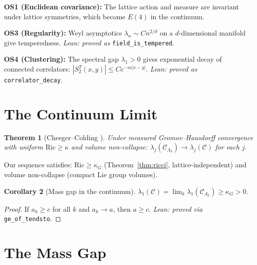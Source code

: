 \documentclass[11pt]{article}
\newtheorem{theorem}{Theorem}[section]
\newtheorem{corollary}[theorem]{Corollary}
\theoremstyle{definition}
\newcommand{\calC}{\mathcal{C}}
\newcommand{\Ric}{\mathrm{Ric}}
\begin{document}
\textbf{OS1 (Euclidean covariance):} The lattice action and measure are invariant under lattice symmetries, which become $E(4)$ in the continuum.

\textbf{OS3 (Regularity):} Weyl asymptotics $\lambda_n \sim Cn^{2/d}$ on a $d$-dimensional manifold give temperedness. \textit{Lean: proved as} \texttt{field\_is\_tempered}.

\textbf{OS4 (Clustering):} The spectral gap $\lambda_1 > 0$ gives exponential decay of connected correlators: $|S_2^T(x,y)| \leq Ce^{-m|x-y|}$. \textit{Lean: proved as} \texttt{correlator\_decay}.


\section{The Continuum Limit}
\label{sec:continuum}

\begin{theorem}[Cheeger--Colding \cite{CC97}]\label{thm:eigenvalue-convergence}
Under measured Gromov--Hausdorff convergence with uniform $\Ric \geq \kappa$ and volume non-collapse: $\lambda_j(\calC_{\Lambda_k}) \to \lambda_j(\calC)$ for each $j$.
\end{theorem}

Our sequence satisfies: $\Ric \geq \kappa_G$ (Theorem~\ref{thm:ricci}, lattice-independent) and volume non-collapse (compact Lie group volumes).

\begin{corollary}[Mass gap in the continuum]
$\lambda_1(\calC) = \lim_k \lambda_1(\calC_{\Lambda_k}) \geq \kappa_G > 0$.
\end{corollary}

\begin{proof}
If $a_k \geq c$ for all $k$ and $a_k \to a$, then $a \geq c$. \textit{Lean: proved via} \texttt{ge\_of\_tendsto}.
\end{proof}


\section{The Mass Gap}
\label{sec:gap}
\end{document}
